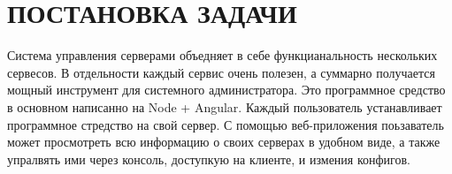 \section{ПОСТАНОВКА ЗАДАЧИ}
\label{sec:problem}

Система управления серверами объедняет в себе функцианальность нескольких сервесов. В отдельности каждый сервис очень полезен, а суммарно получается мощный инструмент для системного администратора. Это программное средство в основном написанно на Node + Angular. Каждый пользователь устанавливает программное стредство на свой сервер. С помощью веб-приложения поьзаватель может просмотреть всю информацию о своих серверах в удобном виде, а также упралвять ими через консоль, доступкую на клиенте, и измения конфигов.




